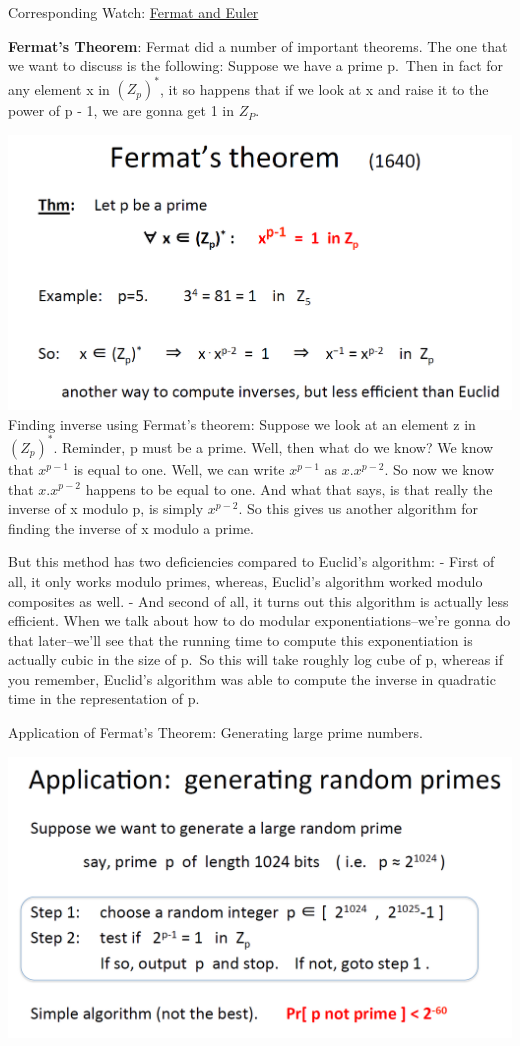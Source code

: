 \documentclass[11pt]{article}
\makeatletter
\def\maxwidth{\ifdim\Gin@nat@width>\linewidth\linewidth
    \else\Gin@nat@width\fi}
\let\Oldincludegraphics\includegraphics
\renewcommand{\includegraphics}[1]{\Oldincludegraphics[width=.8\maxwidth]{#1}}
\makeatother
\begin{document}
Corresponding Watch:
\href{https://www.coursera.org/learn/crypto/lecture/Z2Tso/fermat-and-euler}{Fermat
and Euler}

\textbf{Fermat's Theorem}: Fermat did a number of important theorems.
The one that we want to discuss is the following: Suppose we have a
prime p.~Then in fact for any element x in \((Z_{p})^{*}\), it so
happens that if we look at x and raise it to the power of p - 1, we are
gonna get 1 in \(Z_{P}\).

\includegraphics{./Images/NT-FermatTheorem.png} Finding inverse using
Fermat's theorem: Suppose we look at an element z in \((Z_{p})^{*}\).
Reminder, p must be a prime. Well, then what do we know? We know that
\(x^{p-1}\) is equal to one. Well, we can write \(x^{p-1}\) as
\(x\).\(x^{p-2}\). So now we know that \(x\).\(x^{p-2}\) happens to be
equal to one. And what that says, is that really the inverse of x modulo
p, is simply \(x^{p-2}\). So this gives us another algorithm for finding
the inverse of x modulo a prime.

But this method has two deficiencies compared to Euclid's algorithm: -
First of all, it only works modulo primes, whereas, Euclid's algorithm
worked modulo composites as well. - And second of all, it turns out this
algorithm is actually less efficient. When we talk about how to do
modular exponentiations--we're gonna do that later--we'll see that the
running time to compute this exponentiation is actually cubic in the
size of p.~So this will take roughly log cube of p, whereas if you
remember, Euclid's algorithm was able to compute the inverse in
quadratic time in the representation of p.

Application of Fermat's Theorem: Generating large prime numbers.

\includegraphics{./Images/NT-FermatsThmApp.png}
\end{document}
